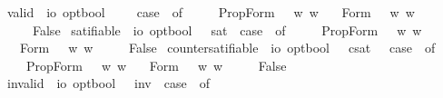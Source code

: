 \begin{isabellebody}
\isamarkupfalse%
\ valid\ {\isacharcolon}{\isacharcolon}\ {\isachardoublequoteopen}io\ opt{\isasymRightarrow}bool{\isachardoublequoteclose}\ \ \ {\isachardoublequoteopen}{\isacharbrackleft}{\isasymphi}{\isacharbrackright}\ {\isasymequiv}\ case\ {\isasymphi}\ of\ \isanewline
\ \ \ \ PropForm\ {\isasympsi}\ {\isasymRightarrow}\ {\isasymforall}w{\isachardot}{\isacharparenleft}{\isasympsi}\ w{\isacharparenright}\isanewline
\ \ {\isacharbar}\ Form\ {\isasympsi}\ {\isasymRightarrow}\ {\isasymforall}w{\isachardot}{\isacharparenleft}{\isasympsi}\ w{\isacharparenright}\isanewline
\ \ {\isacharbar}\ {\isacharunderscore}\ {\isasymRightarrow}\ False{\isachardoublequoteclose}\isanewline
{}\isamarkupfalse%
\ satifiable\ {\isacharcolon}{\isacharcolon}\ {\isachardoublequoteopen}io\ opt{\isasymRightarrow}bool{\isachardoublequoteclose}\ \ \ {\isachardoublequoteopen}{\isacharbrackleft}{\isasymphi}{\isacharbrackright}\isactrlsup s\isactrlsup a\isactrlsup t\ {\isasymequiv}\ case\ {\isasymphi}\ of\ \isanewline
\ \ \ \ PropForm\ {\isasympsi}\ {\isasymRightarrow}\ {\isasymexists}w{\isachardot}{\isacharparenleft}{\isasympsi}\ w{\isacharparenright}\isanewline
\ \ {\isacharbar}\ Form\ {\isasympsi}\ {\isasymRightarrow}\ {\isasymexists}w{\isachardot}{\isacharparenleft}{\isasympsi}\ w{\isacharparenright}\isanewline
\ \ {\isacharbar}\ {\isacharunderscore}\ {\isasymRightarrow}\ False{\isachardoublequoteclose}\isanewline
{}\isamarkupfalse%
\ countersatifiable\ {\isacharcolon}{\isacharcolon}\ {\isachardoublequoteopen}io\ opt{\isasymRightarrow}bool{\isachardoublequoteclose}\ \ \ {\isachardoublequoteopen}{\isacharbrackleft}{\isasymphi}{\isacharbrackright}\isactrlsup c\isactrlsup s\isactrlsup a\isactrlsup t\ {\isasymequiv}\ \ case\ {\isasymphi}\ of\ \isanewline
\ \ \ \ PropForm\ {\isasympsi}\ {\isasymRightarrow}\ {\isasymexists}w{\isachardot}{\isasymnot}{\isacharparenleft}{\isasympsi}\ w{\isacharparenright}\isanewline
\ \ {\isacharbar}\ Form\ {\isasympsi}\ {\isasymRightarrow}\ {\isasymexists}w{\isachardot}{\isasymnot}{\isacharparenleft}{\isasympsi}\ w{\isacharparenright}\isanewline
\ \ {\isacharbar}\ {\isacharunderscore}\ {\isasymRightarrow}\ False{\isachardoublequoteclose}\isanewline
{}\isamarkupfalse%
\ invalid\ {\isacharcolon}{\isacharcolon}\ {\isachardoublequoteopen}io\ opt{\isasymRightarrow}bool{\isachardoublequoteclose}\ \ \ {\isachardoublequoteopen}{\isacharbrackleft}{\isasymphi}{\isacharbrackright}\isactrlsup i\isactrlsup n\isactrlsup v\ {\isasymequiv}\ case\ {\isasymphi}\ of\ \isanewline

\end{isabellebody}
